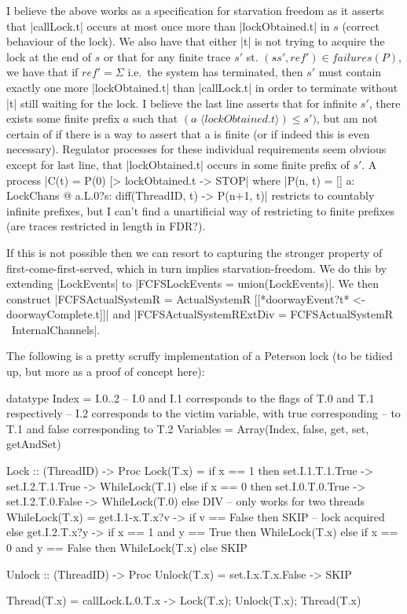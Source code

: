 I believe the above works as a specification for starvation freedom as it asserts that |callLock.t| occurs at most once more than |lockObtained.t| in $s$ (correct behaviour of the lock). We also have that either |t| is not trying to acquire the lock at the end of $s$ or that for any finite trace $s'$ st. $(s\hat{ }s', ref') \in failures(P)$, we have that if $ref' = \Sigma$ i.e.~the system has terminated, then $s'$ must contain exactly one more |lockObtained.t| than |callLock.t| in order to terminate without |t| still waiting for the lock. I believe the last line asserts that for infinite $s'$, there exists some finite prefix $a$ such that $(a\, \hat{ }\,\langle lockObtained.t\rangle) \leq s')$, but am not certain of if there is a way to assert that a is finite (or if indeed this is even necessary). Regulator processes for these individual requirements seem obvious except for last line, that |lockObtained.t| occurs in some finite prefix of $s'$. A process |C(t) = P(0) [> lockObtained.t -> STOP| where |P(n, t) = [] a: LockChans @ a.L.0?s: diff(ThreadID, {t}) -> P(n+1, t)| restricts to countably infinite prefixes, but I can't find a unartificial way of restricting to finite prefixes (are traces restricted in length in FDR?).

If this is not possible then we can resort to capturing the stronger property of first-come-first-served, which in turn implies starvation-freedom. We do this by extending |LockEvents| to |FCFSLockEvents = union(LockEvents)|. We then construct |FCFSActualSystemR = ActualSystemR [[*doorwayEvent?t* <- doorwayComplete.t]]| and |FCFSActualSystemRExtDiv = FCFSActualSystemR \ InternalChannels|.

The following is a pretty scruffy implementation of a Peterson lock (to be tidied up, but more as a proof of concept here):
\begin {cspm}
  datatype Index = I.{0..2}
  -- I.0 and I.1 corresponds to the flags of T.0 and T.1 respectively
  -- I.2 corresponds to the victim variable, with true corresponding 
  --     to T.1 and false corresponding to T.2
  Variables = Array(Index, false, get, set, getAndSet)

  Lock :: (ThreadID) -> Proc
  Lock(T.x) = if x == 1 then set.I.1.T.1.True -> set.I.2.T.1.True -> WhileLock(T.1)
              else if x == 0 then set.I.0.T.0.True -> set.I.2.T.0.False -> WhileLock(T.0)
              else DIV -- only works for two threads
  WhileLock(T.x) = get.I.1-x.T.x?v -> if v == False then SKIP -- lock acquired
                                      else get.I.2.T.x?y ->
                                        if x == 1 and y == True then WhileLock(T.x)
                                        else if x == 0 and y == False then WhileLock(T.x)
                                        else SKIP

  Unlock :: (ThreadID) -> Proc
  Unlock(T.x) = set.I.x.T.x.False -> SKIP

  Thread(T.x) = callLock.L.0.T.x -> Lock(T.x); Unlock(T.x); Thread(T.x)
\end{cspm}

